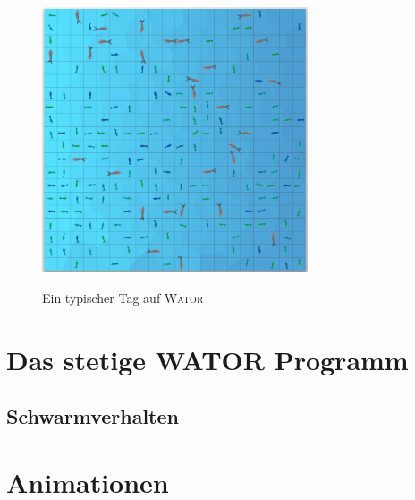 \documentclass[a4paper,11pt]{article}
\newcommand{\wator}{\textsc{Wator }}
\theoremstyle{definition}
\numberwithin{equation}{section}
\begin{document}

	\begin{figure}
		\centering
		\includegraphics[width=0.7\textwidth]{pictures/classic.png}
		\label{fig:encounter}
		\caption{Ein typischer Tag auf \wator}
	\end{figure}

	\section{Das stetige WATOR Programm}
	\subsection{Schwarmverhalten}

	\section{Animationen}
	
	\listoffigures
	


	\nocite{*}
	
\end{document}

